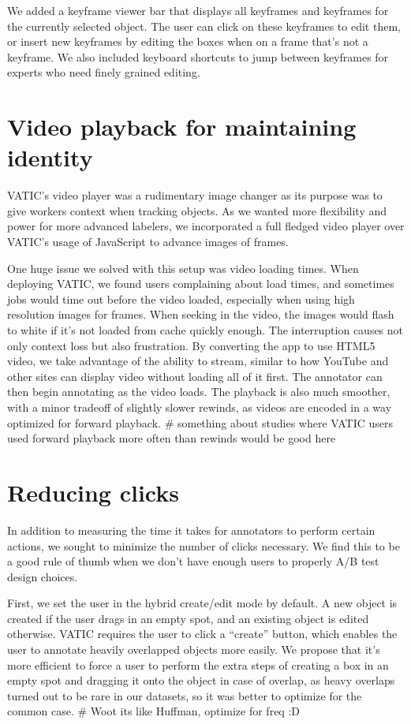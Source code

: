 We added a keyframe viewer bar that displays all keyframes and keyframes for the currently selected object.
The user can click on these keyframes to edit them, or insert new keyframes by editing the boxes when on a frame that's not a keyframe.
We also included keyboard shortcuts to jump between keyframes for experts who need finely grained editing.

\section{Video playback for maintaining identity}

VATIC's video player was a rudimentary image changer as its purpose was to give workers context when tracking objects.
As we wanted more flexibility and power for more advanced labelers, we incorporated a full fledged video player over VATIC's usage of JavaScript to advance images of frames.

One huge issue we solved with this setup was video loading times.
When deploying VATIC, we found users complaining about load times, and sometimes jobs would time out before the video loaded, especially when using high resolution images for frames.
When seeking in the video, the images would flash to white if it's not loaded from cache quickly enough. The interruption causes not only context loss but also frustration.
By converting the app to use HTML5 video, we take advantage of the ability to stream, similar to how YouTube and other sites can display video without loading all of it first.
The annotator can then begin annotating as the video loads.
The playback is also much smoother, with a minor tradeoff of slightly slower rewinds, as videos are encoded in a way optimized for forward playback. # something about studies where VATIC users used forward playback more often than rewinds would be good here

\section{Reducing clicks}

In addition to measuring the time it takes for annotators to perform certain actions, we sought to minimize the number of clicks necessary.
We find this to be a good rule of thumb when we don't have enough users to properly A/B test design choices.

First, we set the user in the hybrid create/edit mode by default.
A new object is created if the user drags in an empty spot, and an existing object is edited otherwise.
VATIC requires the user to click a ``create'' button, which enables the user to annotate heavily overlapped objects more easily.
We propose that it's more efficient to force a user to perform the extra steps of creating a box in an empty spot and dragging it onto the object in case of overlap,
as heavy overlaps turned out to be rare in our datasets, so it was better to optimize for the common case. # Woot its like Huffman, optimize for freq :D

